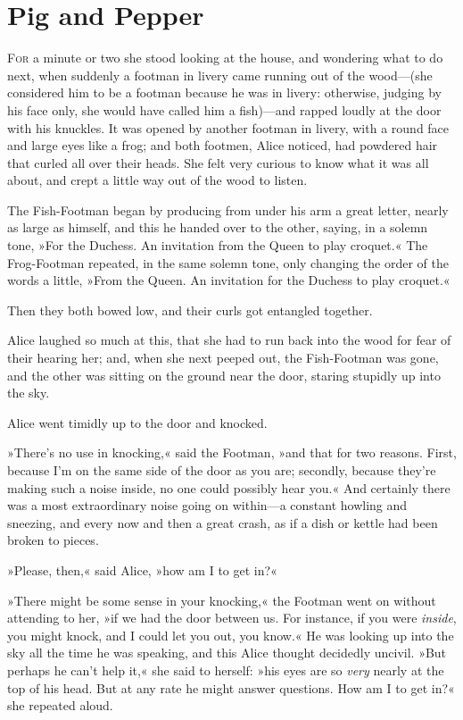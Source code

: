 \chapter{Pig and Pepper}
\lettrine[lines=4,findent=2pt]{F}{or} a minute or two she stood looking at the house, and wondering what to do next, when suddenly a footman in livery came running out of the wood—(she considered him to be a footman because he was in livery: otherwise, judging by his face only, she would have called him a fish)—and rapped loudly at the door with his knuckles. It was opened by another footman in livery, with a round face and large eyes like a frog; and both footmen, Alice noticed, had powdered hair that curled all over their heads. She felt very curious to know what it was all about, and crept a little way out of the wood to listen.

The Fish-Footman began by producing from under his arm a great letter, nearly as large as himself, and this he handed over to the other, saying, in a solemn tone, »For the Duchess. An invitation from the Queen to play croquet.« The Frog-Footman repeated, in the same solemn tone, only changing the order of the words a little, »From the Queen. An invitation for the Duchess to play croquet.«

Then they both bowed low, and their curls got entangled together.

Alice laughed so much at this, that she had to run back into the wood for fear of their hearing her; and, when she next peeped out, the Fish-Footman was gone, and the other was sitting on the ground near the door, staring stupidly up into the sky.

Alice went timidly up to the door and knocked.

»There's no use in knocking,« said the Footman, »and that for two reasons. First, because I'm on the same side of the door as you are; secondly, because they're making such a noise inside, no one could possibly hear you.« And certainly there was a most extraordinary noise going on within—a constant howling and sneezing, and every now and then a great crash, as if a dish or kettle had been broken to pieces.

»Please, then,« said Alice, »how am I to get in?«

»There might be some sense in your knocking,« the Footman went on without attending to her, »if we had the door between us. For instance, if you were \textit{inside}, you might knock, and I could let you out, you know.« He was looking up into the sky all the time he was speaking, and this Alice thought decidedly uncivil. »But perhaps he can't help it,« she said to herself: »his eyes are so \textit{very} nearly at the top of his head. But at any rate he might answer questions. How am I to get in?« she repeated aloud.

